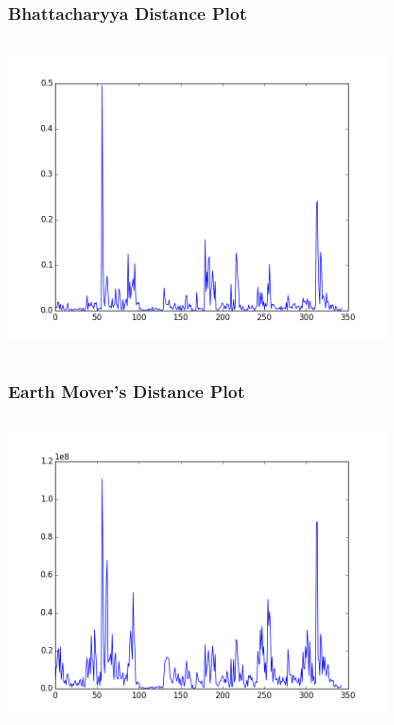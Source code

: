 \documentclass{beamer}
\begin{document}
\begin{frame}
\frametitle{Bhattacharyya Distance Plot}
\begin{columns}
\begin{centering}
\includegraphics[width = 10cm]{Figures/608BDplot}
\end{centering}
\end{columns}
\end{frame}


\begin{frame}
\frametitle{Earth Mover's Distance Plot}
\begin{columns}
\begin{centering}
\includegraphics[width = 10cm]{Figures/608EMDplot}
\end{centering}
\end{columns}
\end{frame}
\end{document}
